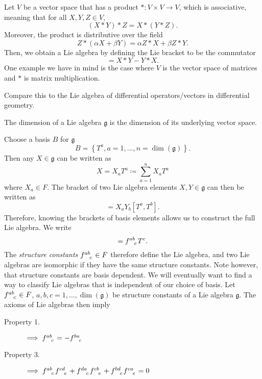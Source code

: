 Let $V$ be a vector space that has a product $*: V \times V \to V$, which is associative, meaning that for all $X, Y, Z \in V$,
\begin{equation}
  (X * Y) * Z = X*(Y*Z).
\end{equation}
Moreover, the product is distributive over the field
\begin{equation}
  Z * (\alpha X + \beta Y) = \alpha Z*X + \beta Z*Y.
\end{equation}
Then, we obtain a Lie algebra by defining the Lie bracket to be the commutator
\begin{equation}
  [X, Y] = X*Y - Y*X.
\end{equation}
One example we have in mind is the case where $V$ is the vector space of matrices and $*$ is matrix multiplication. 
\begin{leftbar}
  \begin{remark}
    Compare this to the Lie algebra of differential operators/vectors in differential geometry.
  \end{remark}
\end{leftbar}

\begin{definition}[dimension]
  The dimension of a Lie algebra $\mathfrak{g}$ is the dimension of its underlying vector space.
\end{definition}

Choose a basis $B$ for $\mathfrak{g}$
\begin{equation}
  B = \left\{ T^a, a=1, \ldots, n = \dim(\mathfrak{g}) \right\}.
\end{equation}
Then any $X \in \mathfrak{g}$ can be written as
\begin{equation}
  X = X_a T^a \coloneq \sum_{a=1}^n X_a T^a
\end{equation}
where $X_a \in F$. The bracket of two Lie algebra elements $X, Y \in \mathfrak{g}$ can then be written as
\begin{equation}
  [X, Y] = X_a Y_b [T^a, T^b].
\end{equation}
Therefore, knowing the brackets of basis elements allows us to construct the full Lie algebra.
We write
\begin{equation}
  [T^a, T^b] = f \indices{^a^b_c} T^c .
\end{equation}
The \emph{structure constants} $f \indices{^{ab}_c} \in F$ therefore define the Lie algebra, and two Lie algebras are isomorphic if they have the same structure constants.
Note however, that structure constants are basis dependent. We will eventually want to find a way to classify Lie algebras that is independent of our choice of basis.
Let $f \indices{^a^b_c} \in F$, $a, b, c = 1, \ldots, \dim(\mathfrak{g})$ be structure constants of a Lie algebra $\mathfrak{g}$.
The axioms of Lie algebras then imply
\begin{description}
  \item[Property 1.] $\implies f \indices{^a^b_c} = -f \indices{^b^a_c}$
  \item[Property 3.] $\implies f \indices{^a^b_c} f \indices{^c^d_e} + f \indices{^d^a_c} f \indices{^c^b_e} + f \indices{^b^d_c} f \indices{^c^a_e} = 0$
\end{description}

